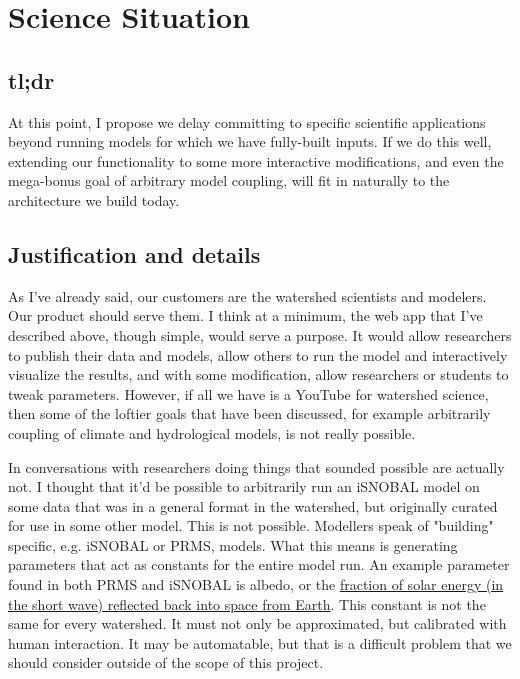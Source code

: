 \documentclass[
11pt, %
a4paper, %
oneside, %
twoside, %
headinclude,footinclude, %
BCOR5mm, %
]{scrartcl}
\begin{document}
\section{Science Situation} %
\label{sec:science}

\subsection{tl;dr} %
\label{sub:tl;dr}

At this point, I propose we delay committing to specific scientific applications beyond
running models for which we have fully-built inputs. If we do this well, extending our
functionality to some more interactive modifications, and even the mega-bonus goal of
arbitrary model coupling, will fit in naturally to the architecture we build today.



\subsection{Justification and details} %
\label{sub:Justification and details}


As I've already said, our customers are the watershed scientists and modelers. Our product
should serve them. I think at a minimum, the web app that I've described above, though 
simple, would serve a purpose. It would allow researchers to publish their data and models,
allow others to run the model and interactively visualize the results, and with some 
modification, allow researchers or students to tweak parameters. However, if all we have
is a YouTube for watershed science, then some of the loftier goals that have been discussed,
for example arbitrarily coupling of climate and hydrological models, is not really possible.

In conversations with researchers doing things that sounded possible are actually not. 
I thought that it'd be possible to arbitrarily run an iSNOBAL model on some data that
was in a general format in the watershed, but originally curated for use in some other model.
This is not possible. Modellers speak of "building" specific, e.g. iSNOBAL or PRMS, models.
What this means is generating parameters that act as constants for the entire model run. 
An example parameter found in both PRMS and iSNOBAL is albedo, or the \href{https://www.esr.org/outreach/glossary/albedo.html}{fraction of solar energy (in the short wave) reflected back into space from Earth}. 
This constant is not the same for every watershed. It must not only be approximated,
but calibrated with human interaction. It may be automatable, but that is a difficult 
problem that we should consider outside of the scope of this project.
\end{document}
